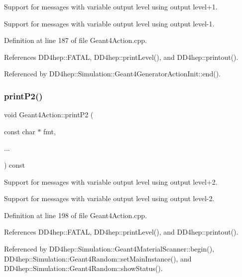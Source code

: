 Support for messages with variable output level using output level+1. 

Support for messages with variable output level using output level-\/1. 

Definition at line 187 of file Geant4\+Action.\+cpp.



References D\+D4hep\+::\+F\+A\+T\+AL, D\+D4hep\+::print\+Level(), and D\+D4hep\+::printout().



Referenced by D\+D4hep\+::\+Simulation\+::\+Geant4\+Generator\+Action\+Init\+::end().

\hypertarget{class_d_d4hep_1_1_simulation_1_1_geant4_action_ae56185e13ffe3255d349b848c2157699}{}\label{class_d_d4hep_1_1_simulation_1_1_geant4_action_ae56185e13ffe3255d349b848c2157699} 
\subsubsection{\texorpdfstring{print\+P2()}{printP2()}}
{\footnotesize\ttfamily void Geant4\+Action\+::print\+P2 (\begin{DoxyParamCaption}\item[{const char $\ast$}]{fmt,  }\item[{}]{... }\end{DoxyParamCaption}) const}



Support for messages with variable output level using output level+2. 

Support for messages with variable output level using output level-\/2. 

Definition at line 198 of file Geant4\+Action.\+cpp.



References D\+D4hep\+::\+F\+A\+T\+AL, D\+D4hep\+::print\+Level(), and D\+D4hep\+::printout().



Referenced by D\+D4hep\+::\+Simulation\+::\+Geant4\+Material\+Scanner\+::begin(), D\+D4hep\+::\+Simulation\+::\+Geant4\+Random\+::set\+Main\+Instance(), and D\+D4hep\+::\+Simulation\+::\+Geant4\+Random\+::show\+Status().

\hypertarget{class_d_d4hep_1_1_simulation_1_1_geant4_action_a4159b11cc0acd293357e80980e3ba7d8}{}\label{class_d_d4hep_1_1_simulation_1_1_geant4_action_a4159b11cc0acd293357e80980e3ba7d8} 
